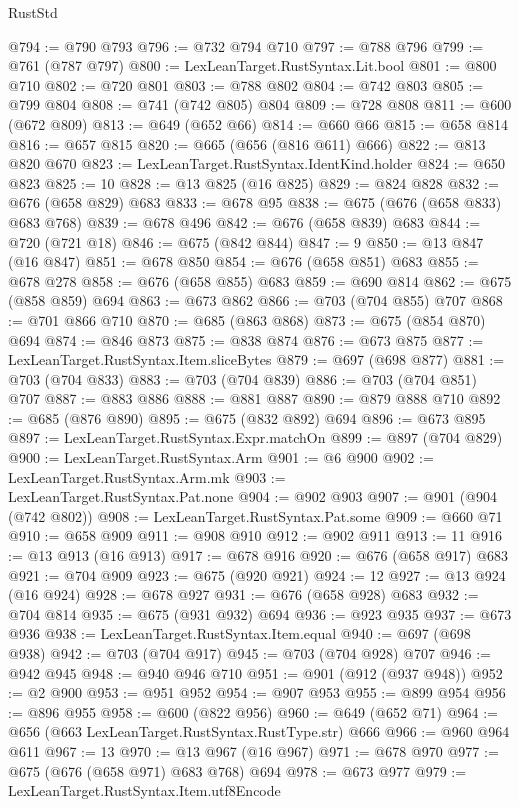 \begin{lexlean}{RustStd}
\begin{coremodule}
@794 := @790 @793
@796 := @732 @794 @710
@797 := @788 @796
@799 := @761 (@787 @797)
@800 := LexLeanTarget.RustSyntax.Lit.bool
@801 := @800 @710
@802 := @720 @801
@803 := @788 @802
@804 := @742 @803
@805 := @799 @804
@808 := @741 (@742 @805) @804
@809 := @728 @808
@811 := @600 (@672 @809)
@813 := @649 (@652 @66)
@814 := @660 @66
@815 := @658 @814
@816 := @657 @815
@820 := @665 (@656 (@816 @611) @666)
@822 := @813 @820 @670
@823 := LexLeanTarget.RustSyntax.IdentKind.holder
@824 := @650 @823
@825 := 10
@828 := @13 @825 (@16 @825)
@829 := @824 @828
@832 := @676 (@658 @829) @683
@833 := @678 @95
@838 := @675 (@676 (@658 @833) @683 @768)
@839 := @678 @496
@842 := @676 (@658 @839) @683
@844 := @720 (@721 @18)
@846 := @675 (@842 @844)
@847 := 9
@850 := @13 @847 (@16 @847)
@851 := @678 @850
@854 := @676 (@658 @851) @683
@855 := @678 @278
@858 := @676 (@658 @855) @683
@859 := @690 @814
@862 := @675 (@858 @859) @694
@863 := @673 @862
@866 := @703 (@704 @855) @707
@868 := @701 @866 @710
@870 := @685 (@863 @868)
@873 := @675 (@854 @870) @694
@874 := @846 @873
@875 := @838 @874
@876 := @673 @875
@877 := LexLeanTarget.RustSyntax.Item.sliceBytes
@879 := @697 (@698 @877)
@881 := @703 (@704 @833)
@883 := @703 (@704 @839)
@886 := @703 (@704 @851) @707
@887 := @883 @886
@888 := @881 @887
@890 := @879 @888 @710
@892 := @685 (@876 @890)
@895 := @675 (@832 @892) @694
@896 := @673 @895
@897 := LexLeanTarget.RustSyntax.Expr.matchOn
@899 := @897 (@704 @829)
@900 := LexLeanTarget.RustSyntax.Arm
@901 := @6 @900
@902 := LexLeanTarget.RustSyntax.Arm.mk
@903 := LexLeanTarget.RustSyntax.Pat.none
@904 := @902 @903
@907 := @901 (@904 (@742 @802))
@908 := LexLeanTarget.RustSyntax.Pat.some
@909 := @660 @71
@910 := @658 @909
@911 := @908 @910
@912 := @902 @911
@913 := 11
@916 := @13 @913 (@16 @913)
@917 := @678 @916
@920 := @676 (@658 @917) @683
@921 := @704 @909
@923 := @675 (@920 @921)
@924 := 12
@927 := @13 @924 (@16 @924)
@928 := @678 @927
@931 := @676 (@658 @928) @683
@932 := @704 @814
@935 := @675 (@931 @932) @694
@936 := @923 @935
@937 := @673 @936
@938 := LexLeanTarget.RustSyntax.Item.equal
@940 := @697 (@698 @938)
@942 := @703 (@704 @917)
@945 := @703 (@704 @928) @707
@946 := @942 @945
@948 := @940 @946 @710
@951 := @901 (@912 (@937 @948))
@952 := @2 @900
@953 := @951 @952
@954 := @907 @953
@955 := @899 @954
@956 := @896 @955
@958 := @600 (@822 @956)
@960 := @649 (@652 @71)
@964 := @656 (@663 LexLeanTarget.RustSyntax.RustType.str) @666
@966 := @960 @964 @611
@967 := 13
@970 := @13 @967 (@16 @967)
@971 := @678 @970
@977 := @675 (@676 (@658 @971) @683 @768) @694
@978 := @673 @977
@979 := LexLeanTarget.RustSyntax.Item.utf8Encode

\end{coremodule}
\end{lexlean}
